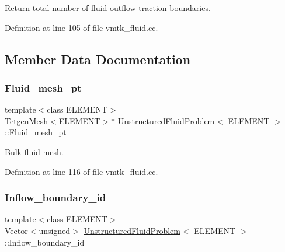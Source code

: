 Return total number of fluid outflow traction boundaries. 



Definition at line 105 of file vmtk\+\_\+fluid.\+cc.



\subsection{Member Data Documentation}
\mbox{\label{classUnstructuredFluidProblem_ade90cb92dd49b9d897ed538b1876b060}} 
\subsubsection{\texorpdfstring{Fluid\+\_\+mesh\+\_\+pt}{Fluid\_mesh\_pt}}
{\footnotesize\ttfamily template$<$class E\+L\+E\+M\+E\+NT$>$ \\
Tetgen\+Mesh$<$E\+L\+E\+M\+E\+NT$>$$\ast$ \hyperlink{classUnstructuredFluidProblem}{Unstructured\+Fluid\+Problem}$<$ E\+L\+E\+M\+E\+NT $>$\+::Fluid\+\_\+mesh\+\_\+pt\hspace{0.3cm}{\ttfamily [private]}}



Bulk fluid mesh. 



Definition at line 116 of file vmtk\+\_\+fluid.\+cc.

\mbox{\label{classUnstructuredFluidProblem_a2923e009bcea7cdbdd7ea5788580a3f8}} 
\subsubsection{\texorpdfstring{Inflow\+\_\+boundary\+\_\+id}{Inflow\_boundary\_id}}
{\footnotesize\ttfamily template$<$class E\+L\+E\+M\+E\+NT$>$ \\
Vector$<$unsigned$>$ \hyperlink{classUnstructuredFluidProblem}{Unstructured\+Fluid\+Problem}$<$ E\+L\+E\+M\+E\+NT $>$\+::Inflow\+\_\+boundary\+\_\+id\hspace{0.3cm}{\ttfamily [private]}}



